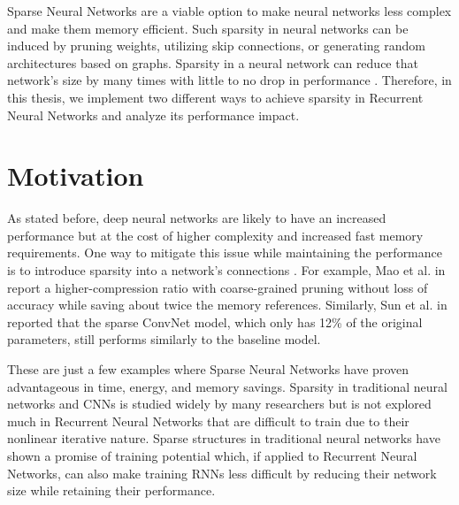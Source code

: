 Sparse Neural Networks are a viable option to make neural networks less complex and make them memory efficient. Such sparsity in neural networks can be induced by pruning weights, utilizing skip connections, or generating random architectures based on graphs. Sparsity in a neural network can reduce that network's size by many times with little to no drop in performance \cite{sparse_nn, dey, liu}. Therefore, in this thesis, we implement two different ways to achieve sparsity in Recurrent Neural Networks and analyze its performance impact.



\section{Motivation}\label{section:motivation}

As stated before, deep neural networks are likely to have an increased performance but at the cost of higher complexity and increased fast memory requirements. One way to mitigate this issue while maintaining the performance is to introduce sparsity into a network's connections \cite{deep_res}. For example, Mao et al. in \cite{mao} report a higher-compression ratio with coarse-grained pruning without loss of accuracy while saving about twice the memory references. Similarly, Sun et al. in \cite{sparse_face} reported that the sparse ConvNet model, which only has 12\% of the original parameters, still performs similarly to the baseline model.

These are just a few examples where Sparse Neural Networks have proven advantageous in time, energy, and memory savings. Sparsity in traditional neural networks and CNNs is studied widely by many researchers but is not explored much in Recurrent Neural Networks that are difficult to train due to their nonlinear iterative nature. Sparse structures in traditional neural networks have shown a promise of training potential \cite{sparse_nn} which, if applied to Recurrent Neural Networks, can also make training RNNs less difficult by reducing their network size while retaining their performance.


